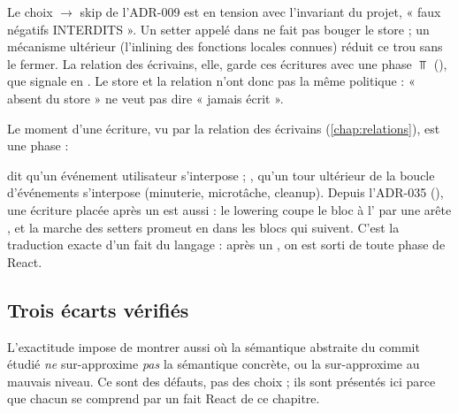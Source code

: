 \begin{piege}
Le choix \og {} $\to$ skip\fg{} de l'ADR-009 est en tension avec
l'invariant du projet, « faux négatifs INTERDITS ». Un setter appelé dans
 ne fait pas bouger le store ; un mécanisme
ultérieur (l'inlining des fonctions locales connues) réduit ce trou sans le
fermer. La relation des écrivains, elle, garde ces écritures avec une phase
$\Top$ (), que  signale
en \Warning. Le store et la relation n'ont donc pas la même politique : « absent
du store » ne veut pas dire « jamais écrit ».
\end{piege}

Le moment d'une écriture, vu par la relation des écrivains
(\cref{chap:relations}), est une phase :


 dit qu'un événement utilisateur s'interpose ; ,
qu'un tour ultérieur de la boucle d'événements s'interpose (minuterie,
microtâche, cleanup). Depuis l'ADR-035 (), une écriture placée après un
 est aussi  : le lowering coupe le bloc à l'
par une arête , et la marche des setters promeut
 en  dans les blocs qui suivent. C'est la traduction
exacte d'un fait du langage : après un , on est sorti de toute
phase de React.

\subsection{Trois écarts vérifiés}

L'exactitude impose de montrer aussi où la sémantique abstraite du commit
étudié \emph{ne} sur-approxime \emph{pas} la sémantique concrète, ou la
sur-approxime au mauvais niveau. Ce sont des défauts, pas des choix ; ils sont
présentés ici parce que chacun se comprend par un fait React de ce chapitre.

